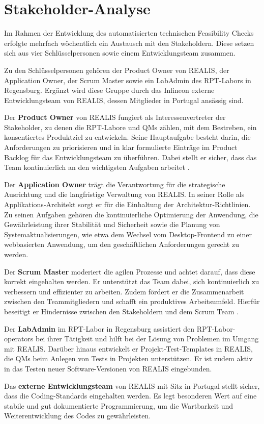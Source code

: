 \section{Stakeholder-Analyse}
Im Rahmen der Entwicklung des automatisierten technischen Feasibility Checks erfolgte mehrfach wöchentlich ein Austausch mit den Stakeholdern. Diese setzen sich aus vier Schlüsselpersonen sowie einem Entwicklungsteam zusammen.

Zu den Schlüsselpersonen gehören der Product Owner von \gls{REALIS}, der Application Owner, der Scrum Master sowie ein LabAdmin des \gls{RPT}-Labors in Regensburg. Ergänzt wird diese Gruppe durch das Infineon externe Entwicklungsteam von \gls{REALIS}, dessen Mitglieder in Portugal ansässig sind.

Der \textbf{Product Owner} von \gls{REALIS} fungiert als Interessenvertreter der Stakeholder, zu denen die \gls{RPT}-Labore und \glspl{QM} zählen, mit dem Bestreben, ein konsentiertes Produktziel zu entwickeln. Seine Hauptaufgabe besteht darin, die Anforderungen zu priorisieren und in klar formulierte Einträge im Product Backlog für das Entwicklungsteam zu überführen. Dabei stellt er sicher, dass das Team kontinuierlich an den wichtigsten Aufgaben arbeitet \cite{scrumguide2020}.

Der \textbf{Application Owner} trägt die Verantwortung für die strategische Ausrichtung und die langfristige Verwaltung von \gls{REALIS}. In seiner Rolle als Applikations-Architekt sorgt er für die Einhaltung der Architektur-Richtlinien. Zu seinen Aufgaben gehören die kontinuierliche Optimierung der Anwendung, die Gewährleistung ihrer Stabilität und Sicherheit sowie die Planung von Systemaktualisierungen, wie etwa dem Wechsel vom Desktop-Frontend zu einer webbasierten Anwendung, um den geschäftlichen Anforderungen gerecht zu werden.

Der \textbf{Scrum Master} moderiert die agilen Prozesse und achtet darauf, dass diese korrekt eingehalten werden. Er unterstützt das Team dabei, sich kontinuierlich zu verbessern und effizienter zu arbeiten. Zudem fördert er die Zusammenarbeit zwischen den Teammitgliedern und schafft ein produktives Arbeitsumfeld. Hierfür beseitigt er Hindernisse zwischen den Stakeholdern und dem Scrum Team \cite{scrumguide2020}.

Der \textbf{LabAdmin} im \gls{RPT}-Labor in Regensburg assistiert den \gls{RPT}-Labor-\glspl{operator} bei ihrer Tätigkeit und hilft bei der Lösung von Problemen im Umgang mit \gls{REALIS}. Da\-rüber hinaus entwickelt er Projekt-Test-Templates in \gls{REALIS}, die \glspl{QM} beim Anlegen von Tests in Projekten unterstützen. Er ist zudem aktiv in das Testen neuer Software-Versionen von \gls{REALIS} eingebunden.


Das \textbf{externe Entwicklungsteam} von \gls{REALIS} mit Sitz in Portugal stellt sicher, dass die Coding-Standards eingehalten werden. Es legt besonderen Wert auf eine stabile und gut dokumentierte Programmierung, um die Wartbarkeit und Weiterentwicklung des Codes zu gewährleisten.